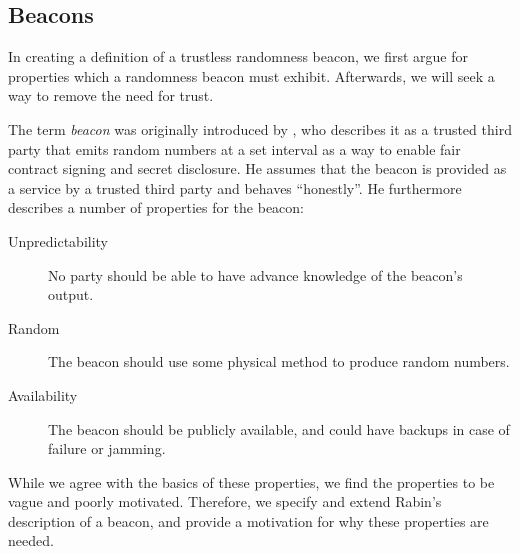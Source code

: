 
\subsection{Beacons}

In creating a definition of a trustless randomness beacon, we first argue for properties which a randomness beacon must exhibit.
Afterwards, we will seek a way to remove the need for trust.

The term \emph{beacon} was originally introduced by \citet{rabin1983transaction}, who describes it as a trusted third party that emits random numbers at a set interval as a way to enable fair contract signing and secret disclosure.
He assumes that the beacon is provided as a service by a trusted third party and behaves \enquote{honestly}.
He furthermore describes a number of properties for the beacon:

\begin{description}
    \item[Unpredictability] No party should be able to have advance knowledge of the beacon's output.
    \item[Random] The beacon should use some physical method to produce random numbers.
    \item[Availability] The beacon should be publicly available, and could have backups in case of failure or jamming.
\end{description}

While we agree with the basics of these properties, we find the properties to be vague and poorly motivated.
Therefore, we specify and extend Rabin's description of a beacon, and provide a motivation for why these properties are needed.

